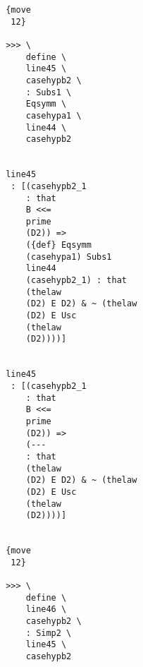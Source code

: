 \documentclass[12pt]{article}
\begin{document}
\begin{verbatim}
                                       {move 
                                        12}

                                       >>> \
                                           define \
                                           line45 \
                                           casehypb2 \
                                           : Subs1 \
                                           Eqsymm \
                                           casehypa1 \
                                           line44 \
                                           casehypb2


                                       line45 
                                        : [(casehypb2_1 
                                           : that 
                                           B <<= 
                                           prime 
                                           (D2)) => 
                                           ({def} Eqsymm 
                                           (casehypa1) Subs1 
                                           line44 
                                           (casehypb2_1) : that 
                                           (thelaw 
                                           (D2) E D2) & ~ (thelaw 
                                           (D2) E Usc 
                                           (thelaw 
                                           (D2))))]


                                       line45 
                                        : [(casehypb2_1 
                                           : that 
                                           B <<= 
                                           prime 
                                           (D2)) => 
                                           (--- 
                                           : that 
                                           (thelaw 
                                           (D2) E D2) & ~ (thelaw 
                                           (D2) E Usc 
                                           (thelaw 
                                           (D2))))]


                                       {move 
                                        12}

                                       >>> \
                                           define \
                                           line46 \
                                           casehypb2 \
                                           : Simp2 \
                                           line45 \
                                           casehypb2



\end{verbatim}
\end{document}

